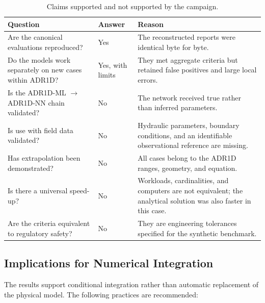 \documentclass[11pt,a4paper]{article}
\begin{document}
\begin{table}[H]
\centering
\caption{Claims supported and not supported by the campaign.}
\label{tab:claim-boundaries}
\small
\begin{tabularx}{\textwidth}{@{}Yp{2.3cm}Y@{}}
\toprule
Question & Answer & Reason \\
\midrule
Are the canonical evaluations reproduced? & Yes & The reconstructed reports
were identical byte for byte. \\
Do the models work separately on new cases within ADR1D? & Yes, with limits &
They met aggregate criteria but retained false positives and large local
errors. \\
Is the ADR1D-ML $\rightarrow$ ADR1D-NN chain validated? & No & The network
received true rather than inferred parameters. \\
Is use with field data validated? & No & Hydraulic parameters, boundary
conditions, and an identifiable observational reference are missing. \\
Has extrapolation been demonstrated? & No & All cases belong to the ADR1D
ranges, geometry, and equation. \\
Is there a universal speed-up? & No & Workloads, cardinalities, and computers
are not equivalent; the analytical solution was also faster in this case. \\
Are the criteria equivalent to regulatory safety? & No & They are engineering
tolerances specified for the synthetic benchmark. \\
\bottomrule
\end{tabularx}
\end{table}

\subsection{Implications for Numerical Integration}

The results support conditional integration rather than automatic replacement
of the physical model. The following practices are recommended:
\end{document}
